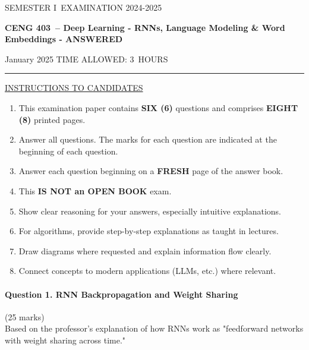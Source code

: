 \documentclass[12pt]{article}
\newcommand{\masunitnumber}{CENG 403}
\newcommand{\examdate}{January 2025}
\newcommand{\academicyear}{2024-2025}
\newcommand{\semester}{I}
\newcommand{\coursename}{Deep Learning - RNNs, Language Modeling \& Word Embeddings - ANSWERED}
\newcommand{\numberofhours}{3}
\begin{document}
\setlength{\headsep}{5truemm}
\setlength{\headheight}{14.5truemm}
\setlength{\voffset}{-0.45truein}
\renewcommand{\headrulewidth}{0.0pt}
\begin{center}
SEMESTER \semester\ EXAMINATION \academicyear
\end{center}
\begin{center}
{\bf \masunitnumber\ -- \coursename}
\end{center}
\vspace{20truemm}
\noindent \examdate\hspace{45truemm} TIME ALLOWED: \numberofhours\ HOURS
\vspace{19truemm}
\hrule
\vspace{19truemm}
\noindent\underline{INSTRUCTIONS TO CANDIDATES}
\vspace{8truemm}
\begin{enumerate}
\item This examination paper contains {\bf SIX (6)} questions and comprises 
{\bf EIGHT (8)} printed pages.
\item Answer all questions. 
The marks for each question are indicated at the beginning of each question.
\item Answer each question beginning on a {\bf FRESH} page of the answer book.
\item This {\bf IS NOT an OPEN BOOK} exam.
\item Show clear reasoning for your answers, especially intuitive explanations.
\item For algorithms, provide step-by-step explanations as taught in lectures.
\item Draw diagrams where requested and explain information flow clearly.
\item Connect concepts to modern applications (LLMs, etc.) where relevant.
\end{enumerate}
\newpage
\lhead{}
\rhead{\masunitnumber}
\chead{}
\lfoot{}
\cfoot{\thepage}
\rfoot{}
\setlength{\footskip}{45pt}

\paragraph{Question 1. RNN Backpropagation and Weight Sharing}\hfill (25 marks)\\
Based on the professor's explanation of how RNNs work as "feedforward networks with weight sharing across time."
\end{document}
